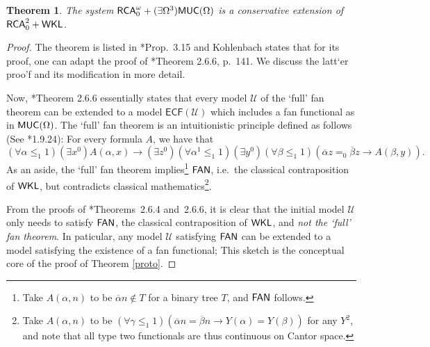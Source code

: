 \documentclass[reqno]{amsart}
\newtheorem{thm}{Theorem}
\def\FAN{\textup{\textsf{FAN}}}
\def\RCA{\textup{\textsf{RCA}}}
\def\WKL{\textup{\textsf{WKL}}}
\def\FAN{\textup{\textsf{FAN}}}
\def\MUC{\textup{\textsf{MUC}}}
\def\di{\rightarrow}
\numberwithin{equation}{section}
\numberwithin{thm}{section}
\begin{document}
\begin{thm}\label{protofinal}
The system $\RCA_{0}^{\omega}+(\exists \Omega^{3})\MUC(\Omega)$ is a conservative extension of $\RCA_{0}^{2}+\WKL$.  
\end{thm}
\begin{proof}
The theorem is listed in \cite{kohlenbach2}*{Prop.\ 3.15} and Kohlenbach states that for its proof, one can adapt the proof of \cite{troelstra1}*{Theorem 2.6.6, p.\ 141}.  
We discuss the latt`er proo'f and its modification in more detail.  %

\medskip

Now, \cite{troelstra1}*{Theorem 2.6.6} essentially states that every model $\mathcal{U}$ of the `full' fan theorem can be extended to a model $\textsf{ECF}(\mathcal{U})$ which includes a fan functional as in $\MUC(\Omega)$.  %
The `full' fan theorem is an intuitionistic principle defined as follows (See \cite{troelstra1}*{1.9.24}):  For every formula $A$, we have that
\[
(\forall \alpha\leq_{1}1)(\exists x^{0})A(\alpha, x)\di (\exists z^{0})(\forall \alpha^{1}\leq_{1}1)(\exists y^{0} )(\forall\beta\leq_{1}1)(\overline{\alpha}z=_{0}\overline{\beta}z\di A(\beta, y)).  
\]
As an aside, the `full' fan theorem implies\footnote{Take $A(\alpha, n)$ to be $\overline{\alpha}n\not\in T$ for a binary tree $T$, and $\FAN$ follows.} $\FAN$, i.e.\ the classical contraposition of $\WKL$, but contradicts classical mathematics\footnote{Take $A(\alpha, n)$ to be $(\forall \gamma\leq_{1}1)(\overline{\alpha}n=\overline{\beta}n\di Y(\alpha)=Y(\beta))$ for any $Y^{2}$, and note that all type two functionals are thus continuous on Cantor space.}.  

\medskip

From the proofs of \cite{troelstra1}*{Theorems~2.6.4 and~2.6.6}, it is clear that the initial model $\mathcal{U}$ only needs to satisfy $\FAN$, the classical contraposition of $\WKL$, and \emph{not the `full' fan theorem}.  
In paticular, any model $\mathcal{U}$ satisfying $\FAN$ can be extended to a model satisfying the existence of a fan functional;  This sketch is the conceptual core of the proof of Theorem \ref{proto}.  

\medskip


\end{proof}
\end{document}
